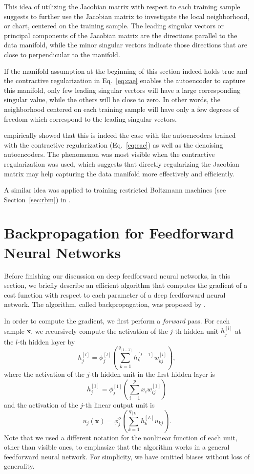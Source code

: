 \documentclass[dissertation,nocontribution,draft*]{aaltoseries}
\newcommand{\qlay}[1]{\left[#1\right]}
\newcommand{\vect}[1]{\mathbf{#1}}
\newcommand{\vx}[0]{\vect{x}}
\begin{document}
This idea of utilizing the Jacobian matrix with respect to
each training sample suggests to further use the Jacobian
matrix to investigate the local neighborhood, or chart,
centered on the training sample. The leading singular
vectors or principal components of the Jacobian matrix are
the directions parallel to the data manifold, while the
minor singular vectors indicate those directions that are
close to perpendicular to the manifold.

If the manifold assumption at the beginning of this section
indeed holds true and the contractive regularization in
Eq.~\eqref{eq:cae} enables the autoencoder to capture this
manifold, only few leading singular vectors will have a large
corresponding singular value, while the others will be
close to zero. In other words, the neighborhood
centered on each training sample will have only a few
degrees of freedom which correspond to the leading singular
vectors.

\citet{Rifai2011} empirically showed that this is indeed the
case with the autoencoders trained with the contractive
regularization (Eq.~\eqref{eq:cae}) as well as the denoising
autoencoders. The phenomenon was most visible when the
contractive regularization was used, which suggests that
directly regularizing the Jacobian matrix may help capturing
the data manifold more effectively and efficiently.

A similar idea was applied to training restricted Boltzmann
machines (see Section~\ref{sec:rbm}) in
.


\section{Backpropagation for Feedforward Neural Networks}
\label{sec:backprop}

Before finishing our discussion on deep feedforward neural
networks, in this section, we briefly describe an efficient
algorithm that computes the gradient of a cost function with
respect to each parameter of a deep feedforward neural
network. The algorithm, called backpropagation, was proposed
by \citet{Rumelhart1986}.

In order to compute the gradient, we first perform a
\textit{forward} pass. For each sample $\vx$, we recursively
compute the activation of the $j$-th hidden unit
$h_j^{\qlay{l}}$
at the $l$-th hidden layer by
\[
h_j^{\qlay{l}} = \phi_j^{\qlay{l}}
\left(\sum_{k=1}^{q_{\qlay{l-1}}} h_k^{\qlay{l-1}}
w_{kj}^{\qlay{l}}\right),
\]
where the activation of the $j$-th hidden unit in the first
hidden layer is
\[
h_j^{\qlay{1}} = \phi_j^{\qlay{1}} \left(\sum_{i=1}^p x_i
w_{ij}^{\qlay{1}}\right)
\]
and the activation of the $j$-th linear output unit is 
\[
u_j(\vx) = \phi_j^{o} \left( \sum_{k=1}^{q_{\qlay{L}}}
h_{k}^{\qlay{L}} u_{kj}
\right).
\]
Note that we used a different notation for the nonlinear
function of each unit, other than visible ones, to emphasize
that the algorithm works in a general feedforward neural
network. 
For simplicity, we have omitted biases without loss of
generality.
\end{document}
